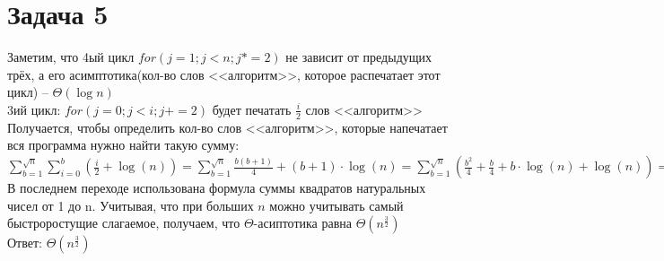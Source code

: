 \documentclass[a4paper,12pt]{article} %
\begin{document}
\section*{Задача 5}
Заметим, что 4ый цикл $ for(j=1; j<n; j*=2) $ не зависит от предыдущих трёх, а его асимптотика(кол-во слов <<алгоритм>>, которое распечатает этот цикл) -- $ \Theta(\log{}n) $\\
3ий цикл: $ for(j=0; j<i; j+=2) $ будет печатать $ \frac{i}{2} $ слов <<алгоритм>>\\
Получается, чтобы определить кол-во слов <<алгоритм>>, которые напечатает вся программа нужно найти такую сумму:\\
$ \sum\limits_{b=1}^{\sqrt{n}} \sum\limits_{i=0}^{b}\left(\frac{i}{2}+\log (n)\right)=\sum\limits_{b=1}^{\sqrt{n}}\frac{b(b+1)}{4}+(b+1) \cdot \log (n) =\sum\limits_{b=1}^{\sqrt{n}}\left(\frac{b^{2}}{4}+\frac{b}{4}+b \cdot \log (n)+\log (n)\right) =
\frac{\sqrt{n} \cdot(\sqrt{n+1}) \cdot(2 \sqrt{n+1})}{24}+\frac{\sqrt{n} \cdot \sqrt{n+1}}{8}+\log (n) \cdot \frac{\sqrt{n} \cdot(\sqrt{n+1})}{2}+\log (n) \cdot \sqrt{n} $\\
В последнем переходе использована формула суммы квадратов натуральных чисел от 1 до n. Учитывая, что при больших $n $ можно учитывать самый быстроростущие слагаемое, получаем, что $ \Theta $-асиптотика равна $ \Theta(n^{\frac{3}{2}}) $\\
Ответ: $ \Theta(n^{\frac{3}{2}}) $
\end{document}
